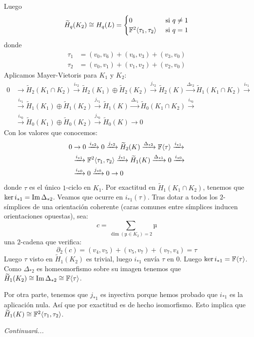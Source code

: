 \documentclass[HS.tex]{subfiles}
\begin{document}
\begin{ej}
Luego
\[ \widetilde{H}_q(K_2) \cong H_q(L) = \begin{cases}0 & \text{ si }q\neq 1\\\mathbb{F}^2\langle{\tau_1,\tau_2}\rangle & \text{ si }q=1\end{cases}\]
donde
\begin{align*}
\tau_1 & = (v_0,v_6)+(v_6,v_3)+(v_3,v_0)\\
\tau_2 & =(v_0,v_1)+(v_1,v_2)+(v_2,v_0)
\end{align*}
Aplicamos Mayer-Vietoris para $K_1$ y $K_2$:
\begin{align*}
0 & \to \widetilde{H}_2(K_1 \cap K_2) \xrightarrow{i_{*2}} \widetilde{H}_2(K_1)\oplus \widetilde{H}_2(K_2) \xrightarrow{j_{*2}} \widetilde{H}_2(K) \xrightarrow{\Delta_{*2}} \widetilde{H}_1(K_1 \cap K_2) \xrightarrow{i_{*1}}\\
& \xrightarrow{i_{*1}} \widetilde{H}_1(K_1)\oplus \widetilde{H}_1(K_2) \xrightarrow{j_{*1}} \widetilde{H}_1(K) \xrightarrow{\Delta_{*1}} \widetilde{H}_0(K_1 \cap K_2) \xrightarrow{i_{*0}}\\
& \xrightarrow{i_{*0}} \widetilde{H}_0(K_1)\oplus \widetilde{H}_0(K_2) \xrightarrow{j_{*0}} \widetilde{H}_0(K) \to 0
\end{align*}
Con los valores que conocemos:
\begin{align*}
0 & \to 0 \xrightarrow{i_{*2}} 0 \xrightarrow{j_{*2}} \widetilde{H}_2(K) \xrightarrow{\Delta_{*2}} \mathbb{F}\langle{\tau}\rangle \xrightarrow{i_{*1}}\\
& \xrightarrow{i_{*1}} \mathbb{F}^2\langle{\tau_1,\tau_2}\rangle \xrightarrow{j_{*1}} \widetilde{H}_1(K) \xrightarrow{\Delta_{*1}} 0 \xrightarrow{i_{*0}}\\
& \xrightarrow{i_{*0}} 0 \xrightarrow{j_{*0}} 0 \to 0
\end{align*}
donde $\tau$ es el único $1$-ciclo en $K_1$.
Por exactitud en $\widetilde{H}_1(K_1 \cap K_2)$, tenemos que $\ker i_{*1} = \operatorname{Im} \Delta_{*2}$.
Veamos que ocurre en $i_{*1}(\tau)$.
Tras dotar a todos los $2$-símplices de una orientación coherente (caras comunes entre símplices inducen orientaciones opuestas), sea:
\[ c = \sum_{\dim(µ \in K_2)=2} µ \]
una $2$-cadena que verifica:
\[ \partial_2(c) = (v_4,v_5)+(v_5,v_7)+(v_7,v_4) = \tau \]
Luego $\tau$ visto en $\widetilde{H}_1(K_2)$ es trivial, luego $i_{*1}$ envía $\tau$ en $0$. Luego $\ker i_{*1}=\mathbb{F}\langle{\tau}\rangle$. Como $\Delta_{*2}$ es homeomorfismo sobre su imagen tenemos que $\widetilde{H}_1(K_2)\cong \operatorname{Im}\Delta_{*2}\cong \mathbb{F}\langle{\tau}\rangle$.

Por otra parte, tenemos que $j_{*1}$ es inyectiva porque hemos probado que $i_{*1}$ es la aplicación nula. Así que por exactitud es de hecho isomorfismo. Esto implica que $\widetilde{H}_1(K)\cong \mathbb{F}^2\langle{\tau_1,\tau_2}\rangle$.

\emph{Continuará...}
\end{ej}
\end{document}

